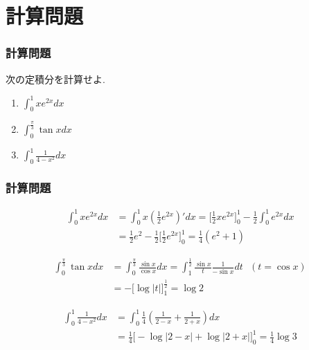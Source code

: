 \section{計算問題}

\begin{frame}
\frametitle{計算問題}

\begin{Prob}
次の定積分を計算せよ. 
\begin{enumerate} 
\item $\int_0^1x e^{2x}dx$
\item $\int_{0}^\frac{\pi}{3} \tan xdx$
\item $\int_0^1\frac{1}{4-x^2}dx$
\end{enumerate}
\end{Prob}

\end{frame}




\begin{frame}
\frametitle{計算問題}


\begin{align*}
\int_0^1x e^{2x}dx & = \int_0^1 x (\frac{1}{2}e^{2x})'dx = \big[\frac{1}{2}xe^{2x}\big]_0^1- \frac{1}{2} \int_0^1e^{2x}dx \\
& = \frac{1}{2}e^2-\frac{1}{2}\big[\frac{1}{2}e^{2x}\big]_0^1=\frac{1}{4}(e^2+1)
\end{align*}

\begin{align*}
\int_0^\frac{\pi}{3} \tan x dx & =\int_0^\frac{\pi}{3} \frac{\sin x}{\cos x} dx = \int_{1}^\frac{1}{2}\frac{\sin x}{t} \frac{1}{-\sin x}dt \ \ \ (t=\cos x) \\
& = -\big[\log|t|\big]_{1}^\frac{1}{2}= \log 2 
\end{align*}

\begin{align*}
\int_0^1\frac{1}{4-x^2}dx & = \int_0^1\frac{1}{4}(\frac{1}{2-x}+\frac{1}{2+x})dx \\
& = \frac{1}{4}\big[-\log|2-x|+\log|2+x|\big]_0^1=\frac{1}{4}\log 3
\end{align*}
\end{frame}

